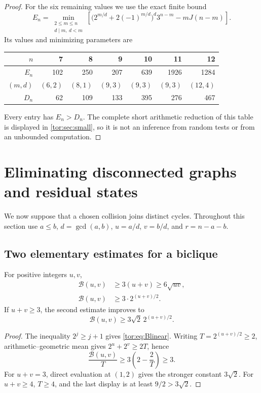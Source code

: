 \documentclass[11pt,a4paper]{article}
\numberwithin{equation}{section}
\theoremstyle{definition}
\theoremstyle{remark}
\newcommand{\Bip}{\mathcal B}
\begin{document}
\begin{proof}
For the six remaining values we use the exact finite bound
\begin{equation}\label{tor:eq:smallcyclebound}
 E_n=\min_{\substack{2\le m\le n\\ d\mid m,\ d<m}}
 \left[\bigl(2^{m/d}+2(-1)^{m/d}\bigr)^d3^{n-m}
       -mJ(n-m)\right].
\end{equation}
Its values and minimizing parameters are
\begin{center}
\begin{tabular}{@{}rrrrrrr@{}}
\toprule
$n$ & 7 & 8 & 9 & 10 & 11 & 12\\
\midrule
$E_n$ & 102 & 250 & 207 & 639 & 1926 & 1284\\
$(m,d)$ & $(6,2)$ & $(8,1)$ & $(9,3)$ & $(9,3)$ & $(9,3)$ & $(12,4)$\\
$D_n$ & 62 & 109 & 133 & 395 & 276 & 467\\
\bottomrule
\end{tabular}
\end{center}
Every entry has $E_n>D_n$. The complete short arithmetic reduction of this
table is displayed in \cref{tor:sec:small}, so it is not an inference from
random tests or from an unbounded computation.
\end{proof}

\section{Eliminating disconnected graphs and residual states}\label{tor:sec:cross}

We now suppose that a chosen collision joins distinct cycles. Throughout this
section use $a\le b$, $d=\gcd(a,b)$, $u=a/d$, $v=b/d$, and $r=n-a-b$.

\subsection{Two elementary estimates for a biclique}

\begin{lemma}\label{tor:lem:Bbounds}
For positive integers $u,v$,
\begin{align}
 \Bip(u,v)&\ge3(u+v)\ge6\sqrt{uv},\label{tor:eq:Blinear}\\
 \Bip(u,v)&\ge3\cdot2^{(u+v)/2}.\label{tor:eq:Bsqrt}
\end{align}
If $u+v\ge3$, the second estimate improves to
\begin{equation}\label{tor:eq:Bstrong}
 \Bip(u,v)\ge3\sqrt2\,2^{(u+v)/2}.
\end{equation}
\end{lemma}
\begin{proof}
The inequality $2^j\ge j+1$ gives \eqref{tor:eq:Blinear}. Writing
$T=2^{(u+v)/2}\ge2$, arithmetic--geometric mean gives $2^u+2^v\ge2T$, hence
\[
 \frac{\Bip(u,v)}{T}\ge3\left(2-\frac2T\right)\ge3.
\]
For $u+v=3$, direct evaluation at $(1,2)$ gives the stronger constant
$3\sqrt2$. For $u+v\ge4$, $T\ge4$, and the last display is at least
$9/2>3\sqrt2$.
\end{proof}
\end{document}
